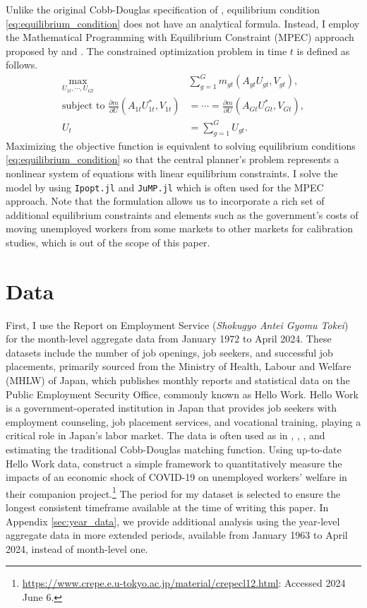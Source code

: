 \documentclass[12pt]{article}
\begin{document}
Unlike the original Cobb-Douglas specification of \cite{csahin2014mismatch}, equilibrium condition \eqref{eq:equilibrium_condition} does not have an analytical formula. 
Instead, I employ the Mathematical Programming with Equilibrium Constraint (MPEC) approach proposed by \cite{su2012constrained} and \cite{dube2012improving}.
The constrained optimization problem in time $t$ is defined as follows.
\begin{align}
    \max_{U_{1t},\cdots,U_{Gt}} & \sum_{g=1}^{G}m_{gt}\left(A_{gt}U_{gt},V_{gt}\right),\\
    \text{subject to }\frac{\partial m}{\partial U}\left(A_{1t}U_{1t}^{*},V_{1t}\right)&=\cdots=\frac{\partial m}{\partial U}\left(A_{Gt}U_{Gt}^{*},V_{Gt}\right) ,\nonumber\\
    U_{t}&=\sum_{g=1}^{G}U_{gt}.\nonumber
\end{align}
Maximizing the objective function is equivalent to solving equilibrium conditions \eqref{eq:equilibrium_condition} so that the central planner's problem represents a nonlinear system of equations with linear equilibrium constraints.
I solve the model by using \texttt{Ipopt.jl} and \texttt{JuMP.jl} which is often used for the MPEC approach.
Note that the formulation allows us to incorporate a rich set of additional equilibrium constraints and elements such as the government's costs of moving unemployed workers from some markets to other markets for calibration studies, which is out of the scope of this paper.




\section{Data}

First, I use the Report on Employment Service (\textit{Shokugyo Antei Gyomu Tokei}) for the month-level aggregate data from January 1972 to April 2024. 
These datasets include the number of job openings, job seekers, and successful job placements, primarily sourced from the Ministry of Health, Labour and Welfare (MHLW) of Japan, which publishes monthly reports and statistical data on the Public Employment Security Office, commonly known as Hello Work. 
Hello Work is a government-operated institution in Japan that provides job seekers with employment counseling, job placement services, and vocational training, playing a critical role in Japan's labor market. 
The data is often used as in \cite{kano2005estimating}, \cite{kambayashi2006vacancy}, \cite{sasaki2008matching}, and \cite{higashi2018spatial} estimating the traditional Cobb-Douglas matching function.
Using up-to-date Hello Work data, \cite{kawata2021first} construct a simple framework to quantitatively measure the impacts of an economic shock of COVID-19 on unemployed workers’ welfare in their companion project.\footnote{\url{https://www.crepe.e.u-tokyo.ac.jp/material/crepecl12.html}: Accessed 2024 June 6.} 
The period for my dataset is selected to ensure the longest consistent timeframe available at the time of writing this paper.
In Appendix \ref{sec:year_data}, we provide additional analysis using the year-level aggregate data in more extended periods, available from January 1963 to April 2024, instead of month-level one.
\end{document}
